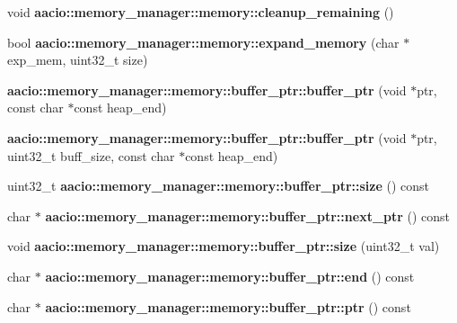 \begin{DoxyCompactItemize}
void {\bfseries aacio\+::memory\+\_\+manager\+::memory\+::cleanup\+\_\+remaining} ()
\item 
\mbox{\label{group__memorycppapi_ga930ca72d90b1dd1fb7df6211caf0e920}} 
bool {\bfseries aacio\+::memory\+\_\+manager\+::memory\+::expand\+\_\+memory} (char $\ast$exp\+\_\+mem, uint32\+\_\+t size)
\item 
\mbox{\label{group__memorycppapi_gab5362414690bca647b67ddce48efe008}} 
{\bfseries aacio\+::memory\+\_\+manager\+::memory\+::buffer\+\_\+ptr\+::buffer\+\_\+ptr} (void $\ast$ptr, const char $\ast$const heap\+\_\+end)
\item 
\mbox{\label{group__memorycppapi_ga8a38acbfa950f1c851e7746dd60c55a2}} 
{\bfseries aacio\+::memory\+\_\+manager\+::memory\+::buffer\+\_\+ptr\+::buffer\+\_\+ptr} (void $\ast$ptr, uint32\+\_\+t buff\+\_\+size, const char $\ast$const heap\+\_\+end)
\item 
\mbox{\label{group__memorycppapi_gadaf12f1411e7e8bafad7f50b6ec7529a}} 
uint32\+\_\+t {\bfseries aacio\+::memory\+\_\+manager\+::memory\+::buffer\+\_\+ptr\+::size} () const
\item 
\mbox{\label{group__memorycppapi_ga9a1b921a3cf4ca088d53de4f068b434f}} 
char $\ast$ {\bfseries aacio\+::memory\+\_\+manager\+::memory\+::buffer\+\_\+ptr\+::next\+\_\+ptr} () const
\item 
\mbox{\label{group__memorycppapi_ga9ba4f573f3d5ef9e52b60dcac933ab8d}} 
void {\bfseries aacio\+::memory\+\_\+manager\+::memory\+::buffer\+\_\+ptr\+::size} (uint32\+\_\+t val)
\item 
\mbox{\label{group__memorycppapi_gaebbbf886b8b777c862f915208d167ad5}} 
char $\ast$ {\bfseries aacio\+::memory\+\_\+manager\+::memory\+::buffer\+\_\+ptr\+::end} () const
\item 
\mbox{\label{group__memorycppapi_ga4a2135d6bd82aaf6ce019be9d580c737}} 
char $\ast$ {\bfseries aacio\+::memory\+\_\+manager\+::memory\+::buffer\+\_\+ptr\+::ptr} () const
\item 
\mbox{\label{group__memorycppapi_gaa65ad663a77024e7b964dd5919e813de}} 

\end{DoxyCompactItemize}
